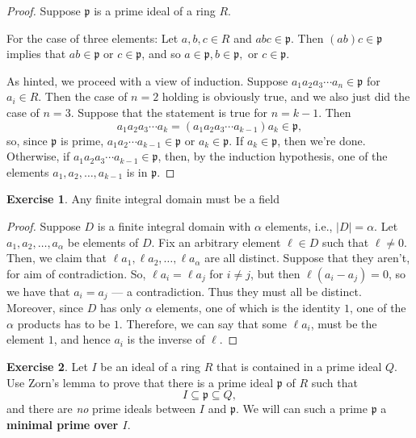 \documentclass[9pt,reqno]{amsart}
\theoremstyle{definition}
\newtheorem{exercise}{Exercise}[section]
\newcommand{\idealp}{\mathfrak{p}}
\begin{document}
\begin{proof} Suppose $\idealp$ is a prime ideal of a ring $R$. 

For the case of three elements: Let $a, b, c \in R$ and $abc \in \idealp$. Then $(ab)c \in \idealp$ implies that $ab \in \idealp$ or $c \in \idealp$, and so $a \in \idealp, b \in \idealp,$ or $c \in \idealp$.

As hinted, we proceed with a view of induction. Suppose $a_1 a_2 a_3 \cdots a_n \in \idealp$ for $a_i \in R$. Then the case of $n = 2$ holding is obviously true, and we also just did the case of $n = 3$. Suppose that the statement is true for $n = k-1$. Then \[a_1 a_2 a_3 \cdots a_k = (a_1 a_2 a_3 \cdots a_{k-1})a_k \in \idealp, \] 
so, since $\idealp$ is prime, $a_1 a_2 \cdots a_{k-1} \in \idealp$ or $a_k \in \idealp$. If $a_k \in \idealp$, then we're done. Otherwise, if $a_1 a_2 a_3 \cdots a_{k-1} \in \idealp$, then, by the induction hypothesis, one of the elements $a_1, a_2, \ldots, a_{k-1}$ is in $\idealp$. 
\end{proof}
\begin{exercise} Any finite integral domain must be a field
\end{exercise} 
\begin{proof} Suppose $D$ is a finite integral domain with $\alpha$ elements, i.e., $|D| = \alpha$. Let $a_1, a_2, \ldots, a_{\alpha}$ be elements of $D$. Fix an arbitrary element $\ell \in D$ such that $\ell \neq 0$. Then, we claim that $\ell a_1, \ell a_2, \ldots, \ell a_{\alpha}$ are all distinct. Suppose that they aren't, for aim of contradiction. So, $\ell a_i = \ell a_j$ for $i \neq j$, but then $\ell (a_i - a_j) = 0$, so we have that $a_i = a_j$ --- a contradiction. Thus they must all be distinct. Moreover, since $D$ has only $\alpha$ elements, one of which is the identity $1$, one of the $\alpha$ products has to be $1$. Therefore, we can say that some $\ell a_i$, must be the element $1$, and hence $a_i$ is the inverse of $\ell$.
\end{proof}
\begin{exercise} \textup{ Let $I$ be an ideal of a ring $R$ that is contained in a prime ideal $Q$. Use Zorn's lemma to prove that there is a prime ideal $\idealp$ of $R$ such that \[
I \subseteq \idealp \subseteq Q, 
\]
and there are \textit{no} prime ideals between $I$ and $\idealp$. We will can such a prime $\idealp$ a \textbf{minimal prime over $I$}. }
\end{exercise} 
\end{document}
